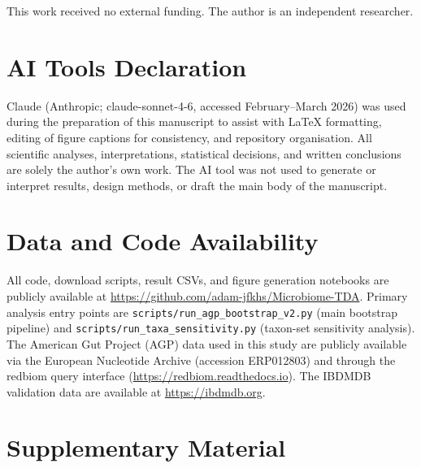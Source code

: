 \documentclass[11pt, a4paper]{article}
\begin{document}
This work received no external funding. The author is an independent researcher.

\section*{AI Tools Declaration}

Claude (Anthropic; claude-sonnet-4-6, accessed February--March 2026) was used
during the preparation of this manuscript to assist with LaTeX formatting,
editing of figure captions for consistency, and repository organisation.
All scientific analyses, interpretations, statistical decisions, and written
conclusions are solely the author's own work. The AI tool was not used to
generate or interpret results, design methods, or draft the main body of the
manuscript.

\section*{Data and Code Availability}

All code, download scripts, result CSVs, and figure generation notebooks
are publicly available at
\url{https://github.com/adam-jfkhs/Microbiome-TDA}.
Primary analysis entry points are
\texttt{scripts/run\_agp\_bootstrap\_v2.py} (main bootstrap pipeline)
and \texttt{scripts/run\_taxa\_sensitivity.py} (taxon-set sensitivity analysis).
The American Gut Project (AGP) data used in this study are publicly
available via the European Nucleotide Archive (accession ERP012803) and
through the redbiom query interface (\url{https://redbiom.readthedocs.io}).
The IBDMDB validation data are available at \url{https://ibdmdb.org}.

\newpage
\section*{Supplementary Material}
\label{sec:supplementary}

\setcounter{figure}{0}
\renewcommand{\thefigure}{S\arabic{figure}}
\end{document}
